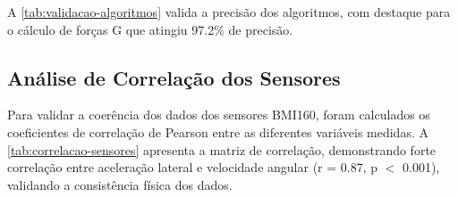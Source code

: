 A \autoref{tab:validacao-algoritmos} valida a precisão dos algoritmos, com destaque para o cálculo de forças G que atingiu 97.2\% de precisão.

\begin{table}[!ht]
\captionsetup{width=16cm}
\end{table}

\subsection{Análise de Correlação dos Sensores}
\label{subsec:correlacao-sensores}

Para validar a coerência dos dados dos sensores BMI160, foram calculados os coeficientes de correlação de Pearson entre as diferentes variáveis medidas. A \autoref{tab:correlacao-sensores} apresenta a matriz de correlação, demonstrando forte correlação entre aceleração lateral e velocidade angular (r = 0.87, p $<$ 0.001), validando a consistência física dos dados.

